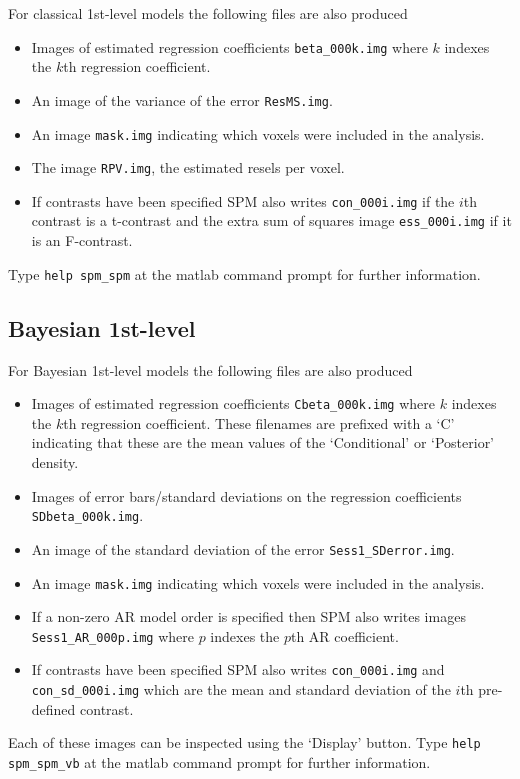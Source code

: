 \documentclass[a4paper,titlepage]{book}
\begin{document}
For classical 1st-level models the following 
files are also produced
\begin{itemize}
\item{Images of estimated regression coefficients  \verb!beta_000k.img! where $k$ indexes the $k$th regression coefficient.}
\item{An image of the variance of the 
error \verb!ResMS.img!.}
\item{An image \verb!mask.img! indicating which voxels 
were included in the analysis.}
\item{The image \verb!RPV.img!, the estimated resels per voxel.}
\item{If contrasts have been specified SPM also writes \verb!con_000i.img!  if the $i$th contrast is a t-contrast and the extra sum of squares image \verb!ess_000i.img! if it is an F-contrast.} 
\end{itemize}
Type \verb!help spm_spm! at the matlab command prompt for further information.

\subsection{Bayesian 1st-level}
For Bayesian 1st-level models the following 
files are also produced
\begin{itemize}
\item{Images of estimated regression coefficients  \verb!Cbeta_000k.img! where $k$ indexes the $k$th regression coefficient. These filenames are prefixed with a `C' indicating that these
are the mean values of the `Conditional' or `Posterior' density.}
\item{Images of error bars/standard deviations on the regression coefficients \verb!SDbeta_000k.img!.}
\item{An image of the standard deviation of the 
error \verb!Sess1_SDerror.img!.}
\item{An image \verb!mask.img! indicating which voxels 
were included in the analysis.}
\item{If a non-zero AR model order is specified then 
SPM also writes images \verb!Sess1_AR_000p.img! where $p$ indexes the $p$th AR coefficient.}
\item{If contrasts have been specified SPM also writes \verb!con_000i.img! and \verb!con_sd_000i.img! which are the mean and standard deviation of the $i$th pre-defined contrast.} 
\end{itemize}
Each of these images can be inspected using the `Display' button. Type \verb!help spm_spm_vb! at the matlab command prompt for further information.
\end{document}
